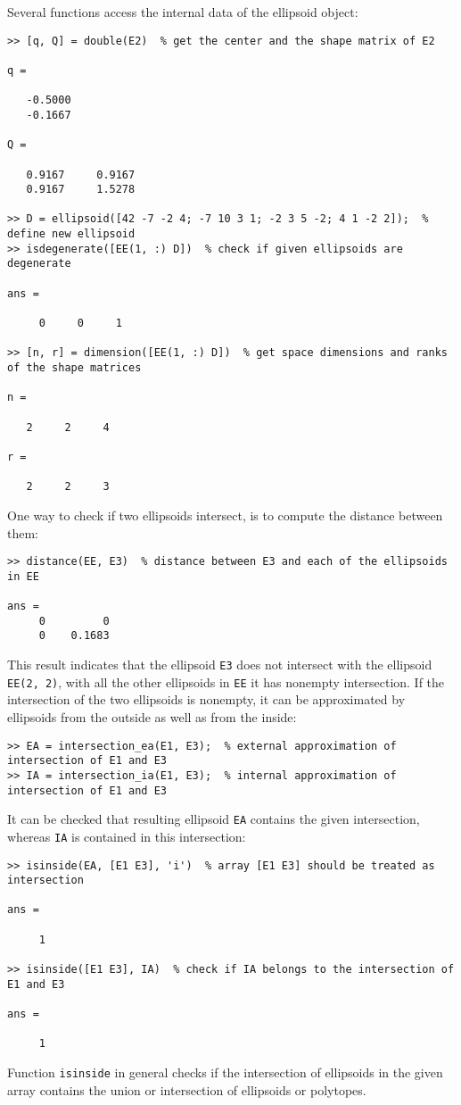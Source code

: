 Several functions  access the internal data of
the ellipsoid object:
{\tt \begin{verbatim}
>> [q, Q] = double(E2)  % get the center and the shape matrix of E2

q =

   -0.5000
   -0.1667

Q =

   0.9167     0.9167
   0.9167     1.5278

>> D = ellipsoid([42 -7 -2 4; -7 10 3 1; -2 3 5 -2; 4 1 -2 2]);  % define new ellipsoid
>> isdegenerate([EE(1, :) D])  % check if given ellipsoids are degenerate

ans =

     0     0     1

>> [n, r] = dimension([EE(1, :) D])  % get space dimensions and ranks of the shape matrices

n =

   2     2     4

r =

   2     2     3
\end{verbatim} }
One way to check if two ellipsoids intersect, is to compute
the distance between them:
{\tt \begin{verbatim}
>> distance(EE, E3)  % distance between E3 and each of the ellipsoids in EE

ans =
     0         0
     0    0.1683
\end{verbatim} }
This result indicates that the ellipsoid {\tt E3} does not intersect with
the ellipsoid {\tt EE(2, 2)}, with all the other ellipsoids in {\tt EE}
it has nonempty intersection. If the intersection of the two ellipsoids is
nonempty, it can be approximated by ellipsoids from the outside as well as
from the inside:
{\tt \begin{verbatim}
>> EA = intersection_ea(E1, E3);  % external approximation of intersection of E1 and E3
>> IA = intersection_ia(E1, E3);  % internal approximation of intersection of E1 and E3
\end{verbatim} }
It can be checked that resulting ellipsoid {\tt EA} contains the given
intersection, whereas {\tt IA} is contained in this intersection:
{\tt \begin{verbatim}
>> isinside(EA, [E1 E3], 'i')  % array [E1 E3] should be treated as intersection

ans =

     1

>> isinside([E1 E3], IA)  % check if IA belongs to the intersection of E1 and E3

ans =

     1
\end{verbatim} }
Function {\tt isinside} in general checks if the intersection of ellipsoids
in the given array contains the union or intersection of ellipsoids or
polytopes.

